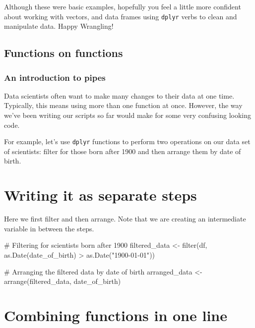 \documentclass[
  letterpaper,
  DIV=11,
  numbers=noendperiod]{scrreprt}
\newenvironment{Shaded}{\begin{snugshade}}{\end{snugshade}}
\newcommand{\CommentTok}[1]{\textcolor[rgb]{0.37,0.37,0.37}{#1}}
\newcommand{\FunctionTok}[1]{\textcolor[rgb]{0.28,0.35,0.67}{#1}}
\newcommand{\NormalTok}[1]{\textcolor[rgb]{0.00,0.23,0.31}{#1}}
\newcommand{\OtherTok}[1]{\textcolor[rgb]{0.00,0.23,0.31}{#1}}
\newcommand{\SpecialCharTok}[1]{\textcolor[rgb]{0.37,0.37,0.37}{#1}}
\newcommand{\StringTok}[1]{\textcolor[rgb]{0.13,0.47,0.30}{#1}}
\begin{document}
Although these were basic examples, hopefully you feel a little more
confident about working with vectors, and data frames using
\texttt{dplyr} verbs to clean and manipulate data. Happy Wrangling!

\subsection{Functions on functions}\label{functions-on-functions}

\subsubsection{An introduction to pipes}\label{an-introduction-to-pipes}

Data scientists often want to make many changes to their data at one
time. Typically, this means using more than one function at once.
However, the way we've been writing our scripts so far would make for
some very confusing looking code.

For example, let's use \texttt{dplyr} functions to perform two
operations on our data set of scientists: filter for those born after
1900 and then arrange them by date of birth.

\section{Writing it as separate steps}

Here we first filter and then arrange. Note that we are creating an
intermediate variable in between the steps.

\begin{Shaded}
\begin{Highlighting}[]
\CommentTok{\# Filtering for scientists born after 1900}
\NormalTok{filtered\_data }\OtherTok{\textless{}{-}} \FunctionTok{filter}\NormalTok{(df, }\FunctionTok{as.Date}\NormalTok{(date\_of\_birth) }\SpecialCharTok{\textgreater{}} \FunctionTok{as.Date}\NormalTok{(}\StringTok{"1900{-}01{-}01"}\NormalTok{))}

\CommentTok{\# Arranging the filtered data by date of birth}
\NormalTok{arranged\_data }\OtherTok{\textless{}{-}} \FunctionTok{arrange}\NormalTok{(filtered\_data, date\_of\_birth)}
\end{Highlighting}
\end{Shaded}

\section{Combining functions in one line}
\end{document}
